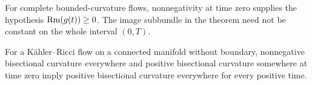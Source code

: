 \begin{remark}
\label{rem:curvature-operator-image-time-interval}
For complete bounded-curvature flows, nonnegativity at time zero supplies the
hypothesis $\operatorname{Rm}(g(t))\geq0$.  The image subbundle in the theorem need not be
constant on the whole interval $(0,T)$.
\end{remark}

\begin{remark}
\label{rem:kahler-ricci-positive-bisectional-curvature}
For a K\"ahler--Ricci flow on a connected manifold without boundary,
nonnegative bisectional curvature everywhere and positive bisectional
curvature somewhere at time zero imply positive bisectional curvature
everywhere for every positive time.
\end{remark}
